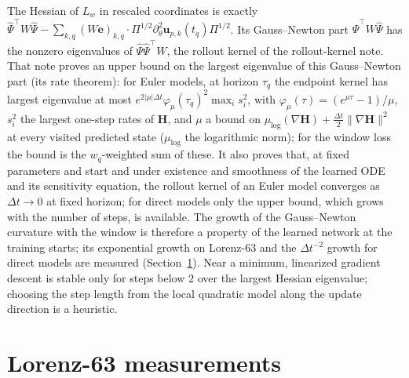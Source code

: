 \documentclass[11pt]{article}
\theoremstyle{definition}
\theoremstyle{remark}
\newcommand{\uu}{\mathbf{u}}
\newcommand{\ee}{\mathbf{e}}
\newcommand{\Hop}{\mathbf{H}}
\newcommand{\dt}{\Delta t}
\newcommand{\Psih}{\hat\Psi}
\begin{document}
The Hessian of $L_w$ in rescaled coordinates is exactly $\Psih^\top W\Psih-\sum_{k,q}(W\ee)_{k,q}\cdot\Pi^{1/2}\partial_\theta^2\uu_{p,k}(t_q)\Pi^{1/2}$.
Its Gauss--Newton part $\Psih^\top W\Psih$ has the nonzero eigenvalues of $\Psih\Psih^\top W$, the rollout kernel of the rollout-kernel note.
That note proves an upper bound on the largest eigenvalue of this Gauss--Newton part (its rate theorem): for Euler models, at horizon $\tau_q$ the endpoint kernel has largest eigenvalue at most $e^{2|\mu|\dt}\varphi_\mu(\tau_q)^2\max_is_i^2$, with $\varphi_\mu(\tau)=(e^{\mu\tau}-1)/\mu$, $s_i^2$ the largest one-step rates of $\Hop$, and $\mu$ a bound on $\mu_{\log}(\nabla\Hop)+\tfrac{\dt}{2}\|\nabla\Hop\|^2$ at every visited predicted state ($\mu_{\log}$ the logarithmic norm); for the window loss the bound is the $w_q$-weighted sum of these.
It also proves that, at fixed parameters and start and under existence and smoothness of the learned ODE and its sensitivity equation, the rollout kernel of an Euler model converges as $\dt\to0$ at fixed horizon; for direct models only the upper bound, which grows with the number of steps, is available.
The growth of the Gauss--Newton curvature with the window is therefore a property of the learned network at the training starts; its exponential growth on Lorenz-63 and the $\dt^{-2}$ growth for direct models are measured (Section~\ref{sec:numerics}).
Near a minimum, linearized gradient descent is stable only for steps below $2$ over the largest Hessian eigenvalue; choosing the step length from the local quadratic model along the update direction is a heuristic.

\section{Lorenz-63 measurements}\label{sec:numerics}
\end{document}
